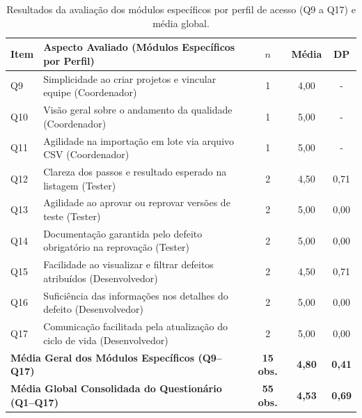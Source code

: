 \begin{table}[H]
\centering
\caption{Resultados da avaliação dos módulos específicos por perfil de acesso (Q9 a Q17) e média global.}
\label{tab:resultados_especificos}
\small
\begin{tabularx}{\textwidth}{|l|X|c|c|c|}
\hline
\textbf{Item} & \textbf{Aspecto Avaliado (Módulos Específicos por Perfil)} & \textbf{$n$} & \textbf{Média} & \textbf{DP} \\ \hline
Q9 & Simplicidade ao criar projetos e vincular equipe (Coordenador) & 1 & 4,00 & - \\ \hline
Q10 & Visão geral sobre o andamento da qualidade (Coordenador) & 1 & 5,00 & - \\ \hline
Q11 & Agilidade na importação em lote via arquivo CSV (Coordenador) & 1 & 5,00 & - \\ \hline
Q12 & Clareza dos passos e resultado esperado na listagem (Tester) & 2 & 4,50 & 0,71 \\ \hline
Q13 & Agilidade ao aprovar ou reprovar versões de teste (Tester) & 2 & 5,00 & 0,00 \\ \hline
Q14 & Documentação garantida pelo defeito obrigatório na reprovação (Tester) & 2 & 5,00 & 0,00 \\ \hline
Q15 & Facilidade ao visualizar e filtrar defeitos atribuídos (Desenvolvedor) & 2 & 4,50 & 0,71 \\ \hline
Q16 & Suficiência das informações nos detalhes do defeito (Desenvolvedor) & 2 & 5,00 & 0,00 \\ \hline
Q17 & Comunicação facilitada pela atualização do ciclo de vida (Desenvolvedor) & 2 & 5,00 & 0,00 \\ \hline
\multicolumn{2}{|l|}{\textbf{Média Geral dos Módulos Específicos (Q9--Q17)}} & \textbf{15 obs.} & \textbf{4,80} & \textbf{0,41} \\ \hline
\multicolumn{2}{|l|}{\textbf{Média Global Consolidada do Questionário (Q1--Q17)}} & \textbf{55 obs.} & \textbf{4,53} & \textbf{0,69} \\ \hline
\end{tabularx}
\end{table}

